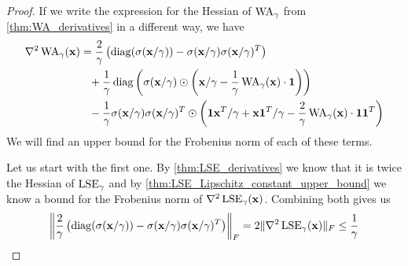 \begin{proof}
 If we write the expression for the Hessian of \(\operatorname{WA}_\gamma\) from \cref{thm:WA_derivatives} in a different way, we have
 \begin{align*}  
   \nabla^2 \operatorname{WA}_\gamma (\mathbf{x}) &= \frac{2}{\gamma} \left({ \operatorname{diag}(\sigma(\mathbf{x}/\gamma)) - \sigma(\mathbf{x}/\gamma)\sigma(\mathbf{x}/\gamma)^T }\right) \\
                                    &\phantom{=} + \frac{1}{\gamma} \operatorname{diag} \left({ \sigma(\mathbf{x}/\gamma) \odot \left({ \mathbf{x}/\gamma - \frac{1}{\gamma} \operatorname{WA}_\gamma(\mathbf{x}) \cdot \mathbf{1} }\right) }\right) \\
                                    &\phantom{=} - \frac{1}{\gamma} \sigma(\mathbf{x}/\gamma) \sigma(\mathbf{x}/\gamma)^T \odot \left({ \mathbf{1} \mathbf{x}^T / \gamma + \mathbf{x} \mathbf{1}^T / \gamma - \frac{2}{\gamma} \operatorname{WA}_\gamma(\mathbf{x}) \cdot \mathbf{1} \mathbf{1}^T }\right) 
 \end{align*}
 We will find an upper bound for the Frobenius norm of each of these terms.
 
 Let us start with the first one. 
 By \cref{thm:LSE_derivatives} we know that it is twice the Hessian of \(\operatorname{LSE}_\gamma\) 
 and by \cref{thm:LSE_Lipschitz_constant_upper_bound} we know a bound for the Frobenius norm of \(\nabla^2 \operatorname{LSE}_\gamma(\mathbf{x})\).
 Combining both gives us
 \[ \left\lVert \frac{2}{\gamma} \left({ \operatorname{diag}(\sigma(\mathbf{x}/\gamma)) - \sigma(\mathbf{x}/\gamma)\sigma(\mathbf{x}/\gamma)^T }\right) \right\rVert_F = 2 \lVert \nabla^2 \operatorname{LSE}_\gamma(\mathbf{x}) \rVert_F \leq \frac{1}{\gamma} \]
 

\end{proof}
